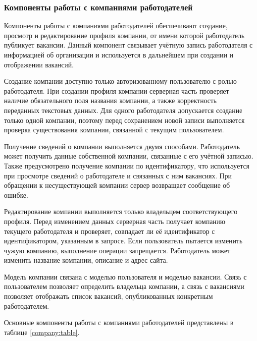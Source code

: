 \subsubsection{Компоненты работы с компаниями работодателей}

Компоненты работы с компаниями работодателей обеспечивают создание, просмотр и редактирование профиля компании, от имени которой работодатель публикует вакансии. Данный компонент связывает учётную запись работодателя с информацией об организации и используется в дальнейшем при создании и отображении вакансий.

Создание компании доступно только авторизованному пользователю с ролью работодателя. При создании профиля компании серверная часть проверяет наличие обязательного поля названия компании, а также корректность переданных текстовых данных. Для одного работодателя допускается создание только одной компании, поэтому перед сохранением новой записи выполняется проверка существования компании, связанной с текущим пользователем.

Получение сведений о компании выполняется двумя способами. Работодатель может получить данные собственной компании, связанные с его учётной записью. Также предусмотрено получение компании по идентификатору, что используется при просмотре сведений о работодателе и связанных с ним вакансиях. При обращении к несуществующей компании сервер возвращает сообщение об ошибке.

Редактирование компании выполняется только владельцем соответствующего профиля. Перед изменением данных серверная часть получает компанию текущего работодателя и проверяет, совпадает ли её идентификатор с идентификатором, указанным в запросе. Если пользователь пытается изменить чужую компанию, выполнение операции запрещается. Работодатель может изменить название компании, описание и адрес сайта.

Модель компании связана с моделью пользователя и моделью вакансии. Связь с пользователем позволяет определить владельца компании, а связь с вакансиями позволяет отображать список вакансий, опубликованных конкретным работодателем.

Основные компоненты работы с компаниями работодателей представлены в таблице \ref{company:table}.

